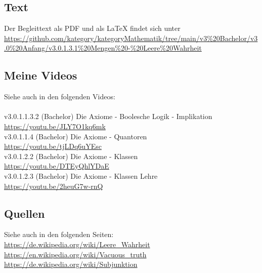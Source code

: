 \documentclass[a4paper]{amsart}
\theoremstyle{definition}
\begin{document}
\subsection*{Text}
Der Begleittext als PDF und als LaTeX findet sich unter
{\tiny
   \url{https://github.com/kategory/kategoryMathematik/tree/main/v3%20Bachelor/v3.0%20Anfang/v3.0.1.3.1%20Mengen%20-%20Leere%20Wahrheit}
}

\subsection*{Meine Videos}
Siehe auch in den folgenden Videos:\\
\\v3.0.1.1.3.2 (Bachelor) Die Axiome - Boolesche Logik - Implikation\\
\url{https://youtu.be/JLY7O1kq6mk}\\
v3.0.1.1.4 (Bachelor) Die Axiome - Quantoren\\
\url{https://youtu.be/tjLDq6uYEsc}\\
v3.0.1.2.2 (Bachelor) Die Axiome - Klassen\\
\url{https://youtu.be/DTEyQhlYDaE}\\
v3.0.1.2.3 (Bachelor) Die Axiome - Klassen Lehre\\
\url{https://youtu.be/2heuG7w-rnQ}\\

\subsection*{Quellen}
Siehe auch in den folgenden Seiten:\\
\url{https://de.wikipedia.org/wiki/Leere_Wahrheit}\\
\url{https://en.wikipedia.org/wiki/Vacuous_truth}\\
\url{https://de.wikipedia.org/wiki/Subjunktion}\\
\end{document}
